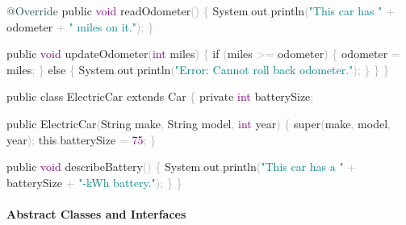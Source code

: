\documentclass[
  justified,
  openright,
]{tufte-book}
\let\subsubsection\paragraph
\let\paragraph\paragraph
\newcommand{\AttributeTok}[1]{\textcolor{DarkSlateGray}{#1}}
\newcommand{\BuiltInTok}[1]{#1}
\newcommand{\ControlFlowTok}[1]{\textcolor{BrandBlue}{#1}}
\newcommand{\DataTypeTok}[1]{\textcolor{Purple}{#1}}
\newcommand{\DecValTok}[1]{\textcolor{Purple}{#1}}
\newcommand{\FunctionTok}[1]{\textcolor{BrandBlue}{#1}}
\newcommand{\KeywordTok}[1]{\textcolor{BrandBlue}{#1}}
\newcommand{\NormalTok}[1]{#1}
\newcommand{\OperatorTok}[1]{\textcolor{DarkGray}{#1}}
\newcommand{\StringTok}[1]{\textcolor{Teal}{#1}}
\newenvironment{Shaded}{%
  \begin{snugshade}
}{%
  \end{snugshade}
}
\let\subsubsection\paragraph
\let\paragraph\paragraph
\begin{document}
\begin{Shaded}
\begin{Highlighting}[]
    \AttributeTok{@Override}
    \KeywordTok{public} \DataTypeTok{void} \FunctionTok{readOdometer}\OperatorTok{()} \OperatorTok{\{}
        \BuiltInTok{System}\OperatorTok{.}\FunctionTok{out}\OperatorTok{.}\FunctionTok{println}\OperatorTok{(}\StringTok{"This car has "} \OperatorTok{+}\NormalTok{ odometer }\OperatorTok{+} \StringTok{" miles on it."}\OperatorTok{);}
    \OperatorTok{\}}

    \KeywordTok{public} \DataTypeTok{void} \FunctionTok{updateOdometer}\OperatorTok{(}\DataTypeTok{int}\NormalTok{ miles}\OperatorTok{)} \OperatorTok{\{}
        \ControlFlowTok{if} \OperatorTok{(}\NormalTok{miles }\OperatorTok{\textgreater{}=}\NormalTok{ odometer}\OperatorTok{)} \OperatorTok{\{}
\NormalTok{            odometer }\OperatorTok{=}\NormalTok{ miles}\OperatorTok{;}
        \OperatorTok{\}} \ControlFlowTok{else} \OperatorTok{\{}
            \BuiltInTok{System}\OperatorTok{.}\FunctionTok{out}\OperatorTok{.}\FunctionTok{println}\OperatorTok{(}\StringTok{"Error: Cannot roll back odometer."}\OperatorTok{);}
        \OperatorTok{\}}
    \OperatorTok{\}}
\OperatorTok{\}}

\KeywordTok{public} \KeywordTok{class}\NormalTok{ ElectricCar }\KeywordTok{extends}\NormalTok{ Car }\OperatorTok{\{}
    \KeywordTok{private} \DataTypeTok{int}\NormalTok{ batterySize}\OperatorTok{;}

    \KeywordTok{public} \FunctionTok{ElectricCar}\OperatorTok{(}\BuiltInTok{String}\NormalTok{ make}\OperatorTok{,} \BuiltInTok{String}\NormalTok{ model}\OperatorTok{,} \DataTypeTok{int}\NormalTok{ year}\OperatorTok{)} \OperatorTok{\{}
        \KeywordTok{super}\OperatorTok{(}\NormalTok{make}\OperatorTok{,}\NormalTok{ model}\OperatorTok{,}\NormalTok{ year}\OperatorTok{);}
        \KeywordTok{this}\OperatorTok{.}\FunctionTok{batterySize} \OperatorTok{=} \DecValTok{75}\OperatorTok{;}
    \OperatorTok{\}}

    \KeywordTok{public} \DataTypeTok{void} \FunctionTok{describeBattery}\OperatorTok{()} \OperatorTok{\{}
        \BuiltInTok{System}\OperatorTok{.}\FunctionTok{out}\OperatorTok{.}\FunctionTok{println}\OperatorTok{(}\StringTok{"This car has a "} \OperatorTok{+}\NormalTok{ batterySize }\OperatorTok{+} \StringTok{"{-}kWh battery."}\OperatorTok{);}
    \OperatorTok{\}}
\OperatorTok{\}}
\end{Highlighting}
\end{Shaded}

\subsubsection{Abstract Classes and
Interfaces}\label{abstract-classes-and-interfaces}
\end{document}
